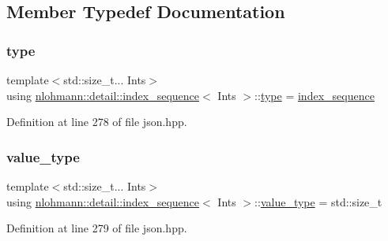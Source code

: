 \subsection{Member Typedef Documentation}
\mbox{\label{structnlohmann_1_1detail_1_1index__sequence_a3c14c4ab277de72b166806193ff4fa10}} 
\subsubsection{\texorpdfstring{type}{type}}
{\footnotesize\ttfamily template$<$std\+::size\+\_\+t... Ints$>$ \\
using \hyperlink{structnlohmann_1_1detail_1_1index__sequence}{nlohmann\+::detail\+::index\+\_\+sequence}$<$ Ints $>$\+::\hyperlink{structnlohmann_1_1detail_1_1index__sequence_a3c14c4ab277de72b166806193ff4fa10}{type} =  \hyperlink{structnlohmann_1_1detail_1_1index__sequence}{index\+\_\+sequence}}



Definition at line 278 of file json.\+hpp.

\mbox{\label{structnlohmann_1_1detail_1_1index__sequence_a2eca43d08fc1eb68bd5fa75b6714d21d}} 
\subsubsection{\texorpdfstring{value\+\_\+type}{value\_type}}
{\footnotesize\ttfamily template$<$std\+::size\+\_\+t... Ints$>$ \\
using \hyperlink{structnlohmann_1_1detail_1_1index__sequence}{nlohmann\+::detail\+::index\+\_\+sequence}$<$ Ints $>$\+::\hyperlink{structnlohmann_1_1detail_1_1index__sequence_a2eca43d08fc1eb68bd5fa75b6714d21d}{value\+\_\+type} =  std\+::size\+\_\+t}



Definition at line 279 of file json.\+hpp.



